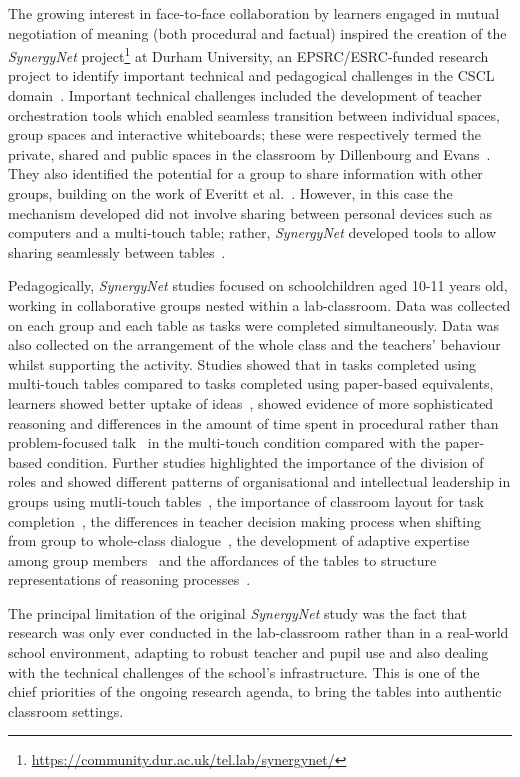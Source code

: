 \documentclass[a4paper,11pt]{article}
\begin{document}
The growing interest in face-to-face collaboration by learners engaged in mutual negotiation of meaning (both procedural and factual) inspired the creation of the {\emph{SynergyNet}} project\footnote{\url{https://community.dur.ac.uk/tel.lab/synergynet/}} at Durham University, an EPSRC/ESRC-funded research project to identify important technical and pedagogical challenges in the CSCL domain~\cite{higgins-et-al:2012}.
Important technical challenges included the development of teacher orchestration tools which enabled seamless transition between individual spaces, group spaces and interactive whiteboards; these were respectively termed the private, shared and public spaces in the classroom by Dillenbourg and Evans~\cite{dillenbourg:2011}.
They also identified the potential for a group to share information with other groups, building on the work of Everitt et al.~\cite{everitt:2006}.
However, in this case the mechanism developed did not involve sharing between personal devices such as computers and a multi-touch table; rather, {\emph{SynergyNet}} developed tools to allow sharing seamlessly between tables~\cite{hatch:2011b}.

Pedagogically, {\emph{SynergyNet}} studies focused on schoolchildren aged 10-11 years old, working in collaborative groups nested within a lab-classroom.
Data was collected on each group and each table as tasks were completed simultaneously.
Data was also collected on the arrangement of the whole class and the teachers’ behaviour whilst supporting the activity.
Studies showed that in tasks completed using multi-touch tables compared to tasks completed using paper-based equivalents, learners showed better uptake of ideas~\cite{mercier:2015}, showed evidence of more sophisticated reasoning  and differences in the amount of time spent in procedural rather than problem-focused talk~\cite{higgins-et-al:2012} in the multi-touch condition compared with the paper-based condition.
Further studies highlighted the importance of the division of roles and showed different patterns of organisational and intellectual leadership in groups using mutli-touch tables~\cite{mercier2014d}, the importance of classroom layout for task completion~\cite{mercier:2014c}, the differences in teacher decision making process when shifting from group to whole-class dialogue~\cite{Joyce-Gibbons:2016}, the development of adaptive expertise among group members~\cite{mercier:2013} and the affordances of the tables to structure representations of reasoning processes~\cite{mercier:2014b}.

The principal limitation of the original {\emph{SynergyNet}} study was the fact that research was only ever conducted in the lab-classroom rather than in a real-world school environment, adapting to robust teacher and pupil use and also dealing with the technical challenges of the school's infrastructure.
This is one of the chief priorities of the ongoing research agenda, to bring the tables into authentic classroom settings.
\end{document}
